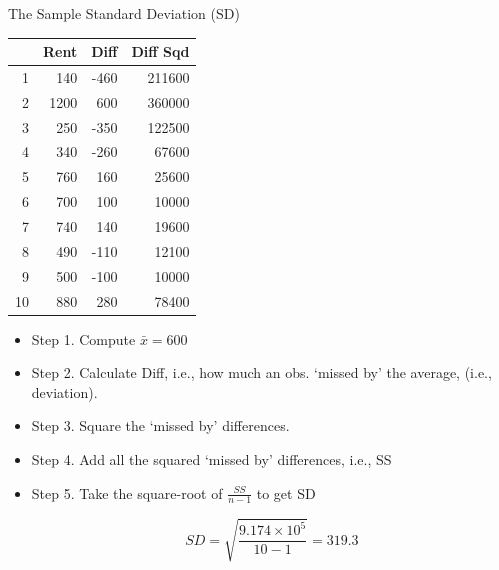\documentclass[14pt]{beamer}\usepackage[]{graphicx}\usepackage[]{color}
\begin{document}
\begin{frame}[fragile]{The Sample Standard Deviation (SD)}

\begin{minipage}[ht]{5cm}

{\footnotesize{
\begin{table}[ht]
\centering
\begin{tabular}{rrrr}
  \hline
 & Rent & Diff & Diff Sqd \\ 
  \hline
1 & 140 & -460 & 211600 \\ 
  2 & 1200 & 600 & 360000 \\ 
  3 & 250 & -350 & 122500 \\ 
  4 & 340 & -260 & 67600 \\ 
  5 & 760 & 160 & 25600 \\ 
  6 & 700 & 100 & 10000 \\ 
  7 & 740 & 140 & 19600 \\ 
  8 & 490 & -110 & 12100 \\ 
  9 & 500 & -100 & 10000 \\ 
  10 & 880 & 280 & 78400 \\ 
   \hline
\end{tabular}
\end{table}

}}

\end{minipage}
\begin{minipage}[ht]{6cm}

{\footnotesize{
\begin{itemize}
\item<1-> Step 1. Compute $\bar{x} = 600$
\item<2-> Step 2. Calculate Diff, i.e., how much an obs. `missed by' the average, (i.e., deviation).
\item<3-> Step 3. Square the `missed by' differences.
\item<4-> Step 4. Add all the squared `missed by' differences, i.e., SS
\item<5-> Step 5. Take the square-root of $\frac{SS}{n - 1}$ to get SD

\begin{equation*}
SD = \sqrt{ \frac{\ensuremath{9.174\times 10^{5}}}{ 10 - 1 }} = 319.3
\end{equation*}

\end{itemize}
}}
\end{minipage}

\end{frame}
\end{document}
